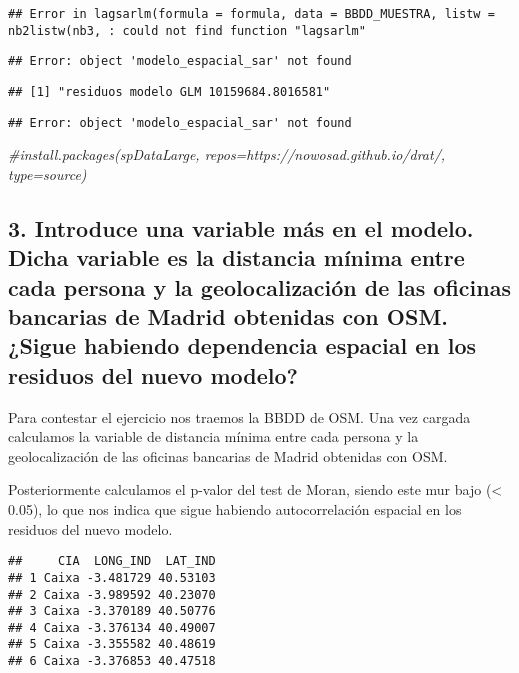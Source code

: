 \documentclass[
]{article}
\newenvironment{Shaded}{\begin{snugshade}}{\end{snugshade}}
\newcommand{\CommentTok}[1]{\textcolor[rgb]{0.56,0.35,0.01}{\textit{#1}}}
\begin{document}
\begin{verbatim}
## Error in lagsarlm(formula = formula, data = BBDD_MUESTRA, listw = nb2listw(nb3, : could not find function "lagsarlm"
\end{verbatim}

\begin{verbatim}
## Error: object 'modelo_espacial_sar' not found
\end{verbatim}

\begin{verbatim}
## [1] "residuos modelo GLM 10159684.8016581"
\end{verbatim}

\begin{verbatim}
## Error: object 'modelo_espacial_sar' not found
\end{verbatim}

\begin{Shaded}
\begin{Highlighting}[]
\CommentTok{\#install.packages(\textquotesingle{}spDataLarge\textquotesingle{}, repos=\textquotesingle{}https://nowosad.github.io/drat/\textquotesingle{}, type=\textquotesingle{}source\textquotesingle{})}
\end{Highlighting}
\end{Shaded}

\subsection{3. Introduce una variable más en el modelo. Dicha variable
es la distancia mínima entre cada persona y la geolocalización de las
oficinas bancarias de Madrid obtenidas con OSM. ¿Sigue habiendo
dependencia espacial en los residuos del nuevo
modelo?}\label{introduce-una-variable-muxe1s-en-el-modelo.-dicha-variable-es-la-distancia-muxednima-entre-cada-persona-y-la-geolocalizaciuxf3n-de-las-oficinas-bancarias-de-madrid-obtenidas-con-osm.-sigue-habiendo-dependencia-espacial-en-los-residuos-del-nuevo-modelo}

Para contestar el ejercicio nos traemos la BBDD de OSM. Una vez cargada
calculamos la variable de distancia mínima entre cada persona y la
geolocalización de las oficinas bancarias de Madrid obtenidas con OSM.

Posteriormente calculamos el p-valor del test de Moran, siendo este mur
bajo (\textless{} 0.05), lo que nos indica que sigue habiendo
autocorrelación espacial en los residuos del nuevo modelo.

\begin{verbatim}
##     CIA  LONG_IND  LAT_IND
## 1 Caixa -3.481729 40.53103
## 2 Caixa -3.989592 40.23070
## 3 Caixa -3.370189 40.50776
## 4 Caixa -3.376134 40.49007
## 5 Caixa -3.355582 40.48619
## 6 Caixa -3.376853 40.47518
\end{verbatim}
\end{document}
